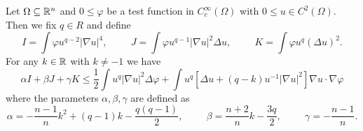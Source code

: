 \begin{lemma}
	\label{lem:99-App-NoGlobalLE-Lemma1}
	Let $\Omega\subseteq\mathbb{R}^n$ and $0\leq\varphi$ be a test function in $C_c^\infty(\Omega)$ with $0\leq u\in C^2(\Omega)$.
	Then we fix $q\in R$ and define
	\begin{equation}
		I=\int\varphi u^{q-2}\left|\nabla u\right|^4, \hspace{1cm} J=\int\varphi u^{q-1}\left|\nabla u\right|^2\Delta u, \hspace{1cm} K=\int \varphi u^q(\Delta u)^2.
		\label{eq:99-App-NoGlobalLE-Def-IJK}
	\end{equation}
	For any $k\in\mathbb{R}$ with $k\neq -1$ we have
	\begin{equation}
		\alpha I + \beta J + \gamma K \leq \frac{1}{2}\int u^q\left|\nabla u\right|^2\Delta\varphi + \int u^q\left[\Delta u + (q-k)u^{-1}\left|\nabla u\right|^2\right]\nabla u\cdot\nabla\varphi
		\label{eq:99-App-NoGlobalLE-Ineq-IJK}
	\end{equation}
	where the parameters $\alpha, \beta, \gamma$ are defined as
	\begin{equation}
		\alpha=-\frac{n-1}{n}k^2 + (q-1)k-\frac{q(q-1)}{2}, \hspace{1cm} \beta=\frac{n+2}{n}k-\frac{3q}{2}, \hspace{1cm} \gamma = -\frac{n-1}{n}.
		\label{eq:99-App-NoGlobalLE-Def-Alph-Bet-Gam}
	\end{equation}
\end{lemma}
